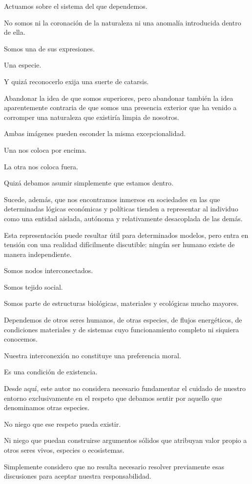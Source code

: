 \documentclass[12pt,a4paper]{article}
\begin{document}
Actuamos sobre el sistema del que dependemos.

No somos ni la coronación de la naturaleza ni una anomalía introducida dentro de ella.

Somos una de sus expresiones.

Una especie.

Y quizá reconocerlo exija una suerte de catarsis.

Abandonar la idea de que somos superiores, pero abandonar también la idea aparentemente contraria de que somos una presencia exterior que ha venido a corromper una naturaleza que existiría limpia de nosotros.

Ambas imágenes pueden esconder la misma excepcionalidad.

Una nos coloca por encima.

La otra nos coloca fuera.

Quizá debamos asumir simplemente que estamos dentro.

Sucede, además, que nos encontramos inmersos en sociedades en las que determinadas lógicas económicas y políticas tienden a representar al individuo como una entidad aislada, autónoma y relativamente desacoplada de las demás.

Esta representación puede resultar útil para determinados modelos, pero entra en tensión con una realidad difícilmente discutible: ningún ser humano existe de manera independiente.

Somos nodos interconectados.

Somos tejido social.

Somos parte de estructuras biológicas, materiales y ecológicas mucho mayores.

Dependemos de otros seres humanos, de otras especies, de flujos energéticos, de condiciones materiales y de sistemas cuyo funcionamiento completo ni siquiera conocemos.

Nuestra interconexión no constituye una preferencia moral.

Es una condición de existencia.

Desde aquí, este autor no considera necesario fundamentar el cuidado de nuestro entorno exclusivamente en el respeto que debamos sentir por aquello que denominamos otras especies.

No niego que ese respeto pueda existir.

Ni niego que puedan construirse argumentos sólidos que atribuyan valor propio a otros seres vivos, especies o ecosistemas.

Simplemente considero que no resulta necesario resolver previamente esas discusiones para aceptar nuestra responsabilidad.
\end{document}
